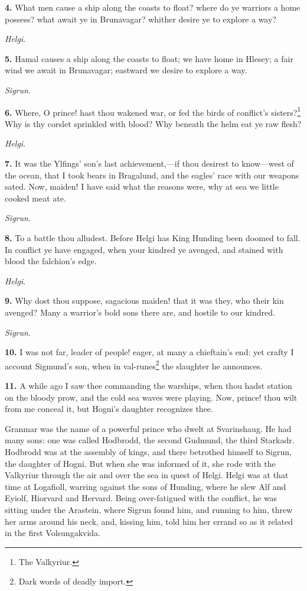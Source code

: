 \textbf{4.} What men cause a ship along the coasts to float? where do ye
warriors a home possess? what await ye in Brunavagar? whither desire
ye to explore a way?

\emph{Helgi}.

\textbf{5.} Hamal causes a ship along the coasts to float; we have home in
Hlesey; a fair wind we await in Brunavagar; eastward we desire to
explore a way.

\emph{Sigrun}.

\textbf{6.} Where, O prince! hast thou wakened war, or fed the birds of
conflict's sisters?\footnote{The Valkyriur.} Why is thy corslet sprinkled with blood? Why
beneath the helm eat ye raw flesh?

\emph{Helgi}.

\textbf{7.} It was the Ylfings' son's last achievement,—if thou desirest to
know—west of the ocean, that I took bears in Bragalund, and the
eagles' race with our weapons sated. Now, maiden! I have said what the
reasons were, why at sea we little cooked meat ate.

\emph{Sigrun}.

\textbf{8.} To a battle thou alludest. Before Helgi has King Hunding been
doomed to fall. In conflict ye have engaged, when your kindred ye
avenged, and stained with blood the falchion's edge.

\emph{Helgi}.

\textbf{9.} Why dost thou suppose, sagacious maiden! that it was they, who
their kin avenged? Many a warrior's bold sons there are, and hostile
to our kindred.

\emph{Sigrun}.

\textbf{10.} I was not far, leader of people! eager, at many a chieftain's
end: yet crafty I account Sigmund's son, when in val-runes\footnote{Dark words of deadly import.} the
slaughter he announces.

\textbf{11.} A while ago I saw thee commanding the warships, when thou hadst
station on the bloody prow, and the cold sea waves were playing. Now,
prince! thou wilt from me conceal it, but Hogni's daughter recognizes
thee.

Granmar was the name of a powerful prince who dwelt at Svarinshaug. He
had many sons: one was called Hodbrodd, the second Gudmund, the third
Starkadr. Hodbrodd was at the assembly of kings, and there betrothed
himself to Sigrun, the daughter of Hogni. But when she was informed of
it, she rode with the Valkyriur through the air and over the sea in
quest of Helgi. Helgi was at that time at Logafioll, warring against
the sons of Hunding, where he slew Alf and Eyiolf, Hiorvard and
Hervard. Being over-fatigued with the conflict, he was sitting under
the Arastein, where Sigrun found him, and running to him, threw her
arms around his neck, and, kissing him, told him her errand so as it
related in the first Volsungakvida.

